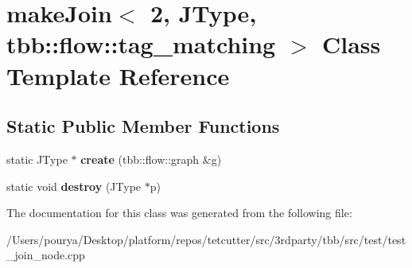 \hypertarget{classmakeJoin_3_012_00_01JType_00_01tbb_1_1flow_1_1tag__matching_01_4}{}\section{make\+Join$<$ 2, J\+Type, tbb\+:\+:flow\+:\+:tag\+\_\+matching $>$ Class Template Reference}
\label{classmakeJoin_3_012_00_01JType_00_01tbb_1_1flow_1_1tag__matching_01_4}
\subsection*{Static Public Member Functions}
\begin{DoxyCompactItemize}
\item 
\hypertarget{classmakeJoin_3_012_00_01JType_00_01tbb_1_1flow_1_1tag__matching_01_4_a92286db3d14fe4f29499c7a98615e97d}{}static J\+Type $\ast$ {\bfseries create} (tbb\+::flow\+::graph \&g)\label{classmakeJoin_3_012_00_01JType_00_01tbb_1_1flow_1_1tag__matching_01_4_a92286db3d14fe4f29499c7a98615e97d}

\item 
\hypertarget{classmakeJoin_3_012_00_01JType_00_01tbb_1_1flow_1_1tag__matching_01_4_a0484f902237c6ae67a0b4e787b79c0e8}{}static void {\bfseries destroy} (J\+Type $\ast$p)\label{classmakeJoin_3_012_00_01JType_00_01tbb_1_1flow_1_1tag__matching_01_4_a0484f902237c6ae67a0b4e787b79c0e8}

\end{DoxyCompactItemize}


The documentation for this class was generated from the following file\+:\begin{DoxyCompactItemize}
\item 
/\+Users/pourya/\+Desktop/platform/repos/tetcutter/src/3rdparty/tbb/src/test/test\+\_\+join\+\_\+node.\+cpp\end{DoxyCompactItemize}
